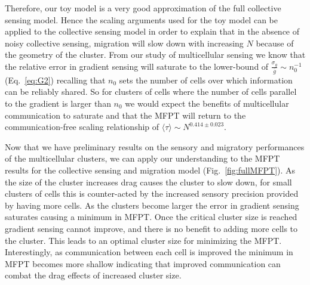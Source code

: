 \documentclass[phys,prelim]{puthesis}
\begin{document}
Therefore, our toy model is a very good approximation of the full collective sensing model. Hence the scaling arguments used for the toy model can be applied to the collective sensing model in order to explain that in the absence of noisy collective sensing, migration will slow down with increasing $N$ because of the geometry of the cluster.
From our study of multicellular sensing we know that the relative error in gradient sensing will saturate to the lower-bound of $\frac{\sigma_g}{\bar{g}} \sim n_0^{-1}$ (Eq.\ \ref{eq:G2}) recalling that $n_0$ sets the number of cells over which information can be reliably shared. So for clusters of cells where the number of cells parallel to the gradient is larger than $n_0$ we would expect the benefits of multicellular communication to saturate and that the MFPT will return to the communication-free scaling relationship of $\langle\tau\rangle \sim N^{0.414\pm0.023}$.

Now that we have preliminary results on the sensory and migratory performances of the multicellular clusters, we can apply our understanding to the MFPT results for the collective sensing and migration model (Fig.\ \ref{fig:fullMFPT}). As the size of the cluster increases drag causes the cluster to slow down, for small clusters of cells this is counter-acted by the increased sensory precision provided by having more cells. As the clusters become larger the error in gradient sensing saturates causing a minimum in MFPT. Once the critical cluster size is reached gradient sensing cannot improve, and there is no benefit to adding more cells to the cluster. This leads to an optimal cluster size for minimizing the MFPT. Interestingly, as communication between each cell is improved the minimum in MFPT becomes more shallow indicating that improved communication can combat the drag effects of increased cluster size.
\end{document}
